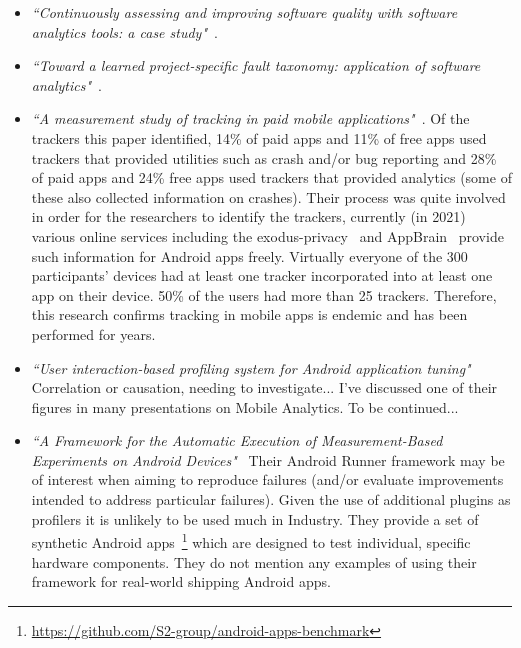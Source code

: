 \begin{itemize}
    \item \emph{``Continuously assessing and improving software quality with software analytics tools: a case study"}~\cite{martinez_fernandez2019_continuously_assessing_and_improving_software_quality_with_software_analytics_tools}.
    
    \item \emph{``Toward a learned project-specific fault taxonomy: application of software analytics"}~\cite{kidwell2015_toward_fault_taxonomy_application_of_software_analytics}.
    
    \item \emph{``A measurement study of tracking in paid mobile applications"}~\citep{seneviratne2015_a_measurement_study_of_tracking_in_paid_mobile_apps}. Of the trackers this paper identified, 14\% of paid apps and 11\% of free apps used trackers that provided utilities such as crash and/or bug reporting and 28\% of paid apps and 24\% free apps used trackers that provided analytics (some of these also collected information on crashes). Their process was quite involved in order for the researchers to identify the trackers, currently (in 2021) various online services including the exodus-privacy~\citep{exodus_privacy_project} and AppBrain~\citep{appbrain} provide such information for Android apps freely. Virtually everyone of the 300 participants' devices had at least one tracker incorporated into at least one app on their device. 50\% of the users had more than 25 trackers. Therefore, this research confirms tracking in mobile apps is endemic and has been performed for years. 
    
    \item \emph{``User interaction-based profiling system for Android application tuning"}~\citep{lee2014_user_interaction_based_profiling_system_for_android_app_tuning} Correlation or causation, needing to investigate... I've discussed one of their figures in many presentations on Mobile Analytics. To be continued...
    
    \item \emph{``A Framework for the Automatic Execution of Measurement-Based Experiments on Android Devices"}~\citep{malavolta2020_android_runner} Their Android Runner framework may be of interest when aiming to reproduce failures (and/or evaluate improvements intended to address particular failures). Given the use of additional plugins as profilers it is unlikely to be used much in Industry. They provide a set of synthetic Android apps~\footnote{\url{https://github.com/S2-group/android-apps-benchmark}} which are designed to test individual, specific hardware components. They do not mention any examples of using their framework for real-world shipping Android apps.
    

\end{itemize}
